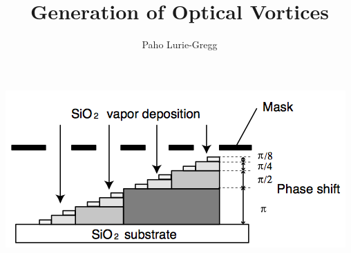 \documentclass[]{beamer}
\title{}
\author{Paho Lurie-Gregg}
\date{}
\begin{document}
\begin{frame}
	\title{Generation of Optical Vortices}
	\centering
	\includegraphics[scale=.5]{MSPP.jpg}
\end{frame}

\begin{frame}

\end{frame}
\end{document}
